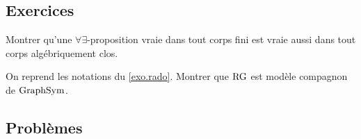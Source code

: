 \subsection{Exercices}

\begin{exercise}
  Montrer qu'une $\forall\exists$-proposition vraie dans tout corps fini est
  vraie aussi dans tout corps algébriquement clos.
\end{exercise}

\begin{exercise}
  On reprend les notations du \cref{exo.rado}. Montrer que $\operatorname{RG}$ est modèle
  compagnon de $\operatorname{GraphSym}$.
\end{exercise}

\clearpage

\subsection{Problèmes}
